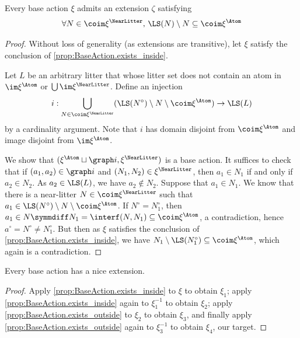 \begin{proposition}
  \label{prop:BaseAction.exists_outside}
  \leanok
  Every base action \( \xi \) admits an extension \( \zeta \) satisfying
  \[ \forall N \in \coim \xi^\NearLitter,\, \LS(N) \setminus N \subseteq \coim \xi^\Atom \]
\end{proposition}
\begin{proof}
  \leanok
  Without loss of generality (as extensions are transitive), let \( \xi \) satisfy the conclusion of \cref{prop:BaseAction.exists_inside}.

  Let \( L \) be an arbitrary litter that whose litter set does not contain an atom in \( \im \xi^\Atom \) or \( \bigcup \im \xi^\NearLitter \).
  Define an injection
  \[ i : \bigcup_{N \in \coim \xi^\NearLitter} (\LS(N^\circ) \setminus N \setminus \coim \xi^\Atom) \to \LS(L) \]
  by a cardinality argument.
  Note that \( i \) has domain disjoint from \( \coim \xi^\Atom \) and image disjoint from \( \im \xi^\Atom \).

  We show that \( (\xi^\Atom \sqcup \graph i, \xi^\NearLitter) \) is a base action.
  It suffices to check that if \( (a_1, a_2) \in \graph i \) and \( (N_1, N_2) \in \xi^\NearLitter \), then \( a_1 \in N_1 \) if and only if \( a_2 \in N_2 \).
  As \( a_2 \in \LS(L) \), we have \( a_2 \notin N_2 \).
  Suppose that \( a_1 \in N_1 \).
  We know that there is a near-litter \( N \in \coim \xi^\NearLitter \) such that \( a_1 \in \LS(N^\circ) \setminus N \setminus \coim \xi^\Atom \).
  If \( N^\circ = N_1^\circ \), then \( a_1 \in N \symmdiff N_1 = \interf(N, N_1) \subseteq \coim \xi^\Atom \), a contradiction, hence \( a^\circ = N^\circ \neq N_1^\circ \).
  But then as \( \xi \) satisfies the conclusion of \cref{prop:BaseAction.exists_inside}, we have \( N_1 \setminus \LS(N_1^\circ) \subseteq \coim \xi^\Atom \), which again is a contradiction.
\end{proof}
\begin{proposition}
  \label{prop:BaseAction.exists_nice}
  \leanok
  Every base action has a nice extension.
\end{proposition}
\begin{proof}
  \leanok
  Apply \cref{prop:BaseAction.exists_inside} to \( \xi \) to obtain \( \xi_1 \); apply \cref{prop:BaseAction.exists_inside} again to \( \xi_1^{-1} \) to obtain \( \xi_2 \); apply \cref{prop:BaseAction.exists_outside} to \( \xi_2 \) to obtain \( \xi_3 \), and finally apply \cref{prop:BaseAction.exists_outside} again to \( \xi_3^{-1} \) to obtain \( \xi_4 \), our target.
\end{proof}

